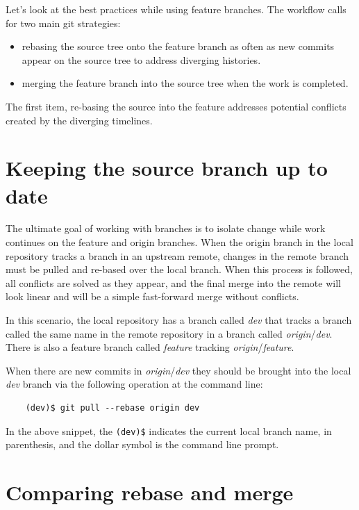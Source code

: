 \documentclass[10pt]{article}
\begin{document}
Let's look at the best practices while using feature branches.
The workflow calls for two main git strategies:

\begin{itemize}
    \item rebasing the source tree onto the feature branch as often as new commits appear on the source tree to address diverging histories.
    \item merging the feature branch into the source tree when the work is completed.
\end{itemize}

The first item, re-basing the source into the feature addresses potential conflicts created by the diverging timelines.

\section{Keeping the source branch up to date}

The ultimate goal of working with branches is to isolate change while work continues on the feature and origin branches.
When the origin branch in the local repository tracks a branch in an upstream remote, changes in the remote branch must be pulled and re-based over the local branch.
When this process is followed, all conflicts are solved as they appear, and the final merge into the remote will look linear and will be a simple fast-forward merge without conflicts.

In this scenario, the local repository has a branch called \textit{dev} that tracks a branch called the same name in the remote repository in a branch called \textit{origin}/\textit{dev}.
There is also a feature branch called \textit{feature} tracking \textit{origin}/\textit{feature}.

When there are new commits in \textit{origin}/\textit{dev} they should be brought into the local \textit{dev} branch via the following operation at the command line:

\begin{verbatim}
    (dev)$ git pull --rebase origin dev 
\end{verbatim}


In the above snippet, the \verb|(dev)$| indicates the current local branch name, in parenthesis, and the dollar symbol is the command line prompt.


\section{Comparing rebase and merge}
\label{sec:rebaseVsmeerge}
\end{document}
